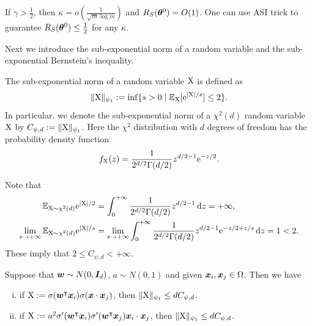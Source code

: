 \documentclass{article}
\begin{document}
\begin{rmk}
    If $\gamma>\frac{1}{2}$, then $\kappa=o(\frac{1}{\sqrt{m}\log m})$ and $R_S(\bm{\theta}^0)=O(1)$. One can use ASI trick \cite{zhang_type_2019} to guarantee $R_S(\bm{\theta}^0)\leq\frac{1}{2}$ for any $\kappa$.
\end{rmk}
Next we introduce the sub-exponential norm of a random variable and the sub-exponential Bernstein's inequality.
\begin{defi}
    The sub-exponential norm of a random variable $\textnormal{X}$ is defined as
    \begin{equation}
        \lVert\textnormal{X}\rVert_{\psi_1} := \inf\{s>0 \mid \mathbb{E}_{\textnormal{X}}[\mathrm{e}^{\lvert\textnormal{X}\rvert/s}]\leq 2\}.
    \end{equation}
    In particular, we denote the sub-exponential norm of a $\chi^2(d)$ random variable $\textnormal{X}$ by $C_{\psi,d}:=\lVert\textnormal{X}\rVert_{\psi_1}$. Here the $\chi^2$ distribution with $d$ degrees of freedom has the probability density function
    \begin{equation*}
        f_{\textnormal{X}}(z)=\frac{1}{2^{d/2}\Gamma(d/2)}z^{d/2-1}\mathrm{e}^{-z/2}.
    \end{equation*}
\end{defi}
\begin{rmk}
    Note that
    \begin{align*}
        \mathbb{E}_{\textnormal{X}\sim\chi^2(d)}\mathrm{e}^{\lvert\textnormal{X}\rvert/2}
         & =\int_0^{+\infty}\frac{1}{2^{d/2}\Gamma(d/2)}z^{d/2-1}\mathop{}\!\mathrm{d}{z}=+\infty,                            \\
        \lim_{s\to+\infty}\mathbb{E}_{\textnormal{X}\sim\chi^2(d)}\mathrm{e}^{\lvert\textnormal{X}\rvert/s}
         & =\lim_{s\to+\infty}\int_0^{+\infty}\frac{1}{2^{d/2}\Gamma(d/2)}z^{d/2-1}\mathrm{e}^{-z/2+z/s}\mathop{}\!\mathrm{d}{z}=1<2.
    \end{align*}
    These imply that $2\leq C_{\psi,d}<+\infty$.
\end{rmk}
\begin{lem}\label{lem..subexponentialnorm}
    Suppose that $\bm{w}\sim N(0,\bm{I}_d)$, $a\sim N(0,1)$ and given $\bm{x}_i,\bm{x}_j \in\Omega$. Then we have
    \begin{enumerate}[(i)]
        \item if $\textnormal{X}:=\sigma(\bm{w}^\intercal\bm{x}_i)\sigma(\bm{x}\cdot\bm{x}_j)$, then $\lVert\textnormal{X}\rVert_{\psi_1}\leq dC_{\psi,d}$.
        \item if $\textnormal{X}:=a^2\sigma'(\bm{w}^\intercal\bm{x}_i)\sigma'(\bm{w}^\intercal\bm{x}_j)\bm{x}_i\cdot\bm{x}_j$, then $\lVert\textnormal{X}\rVert_{\psi_1}\leq dC_{\psi,d}$.
    \end{enumerate}
\end{lem}
\end{document}
